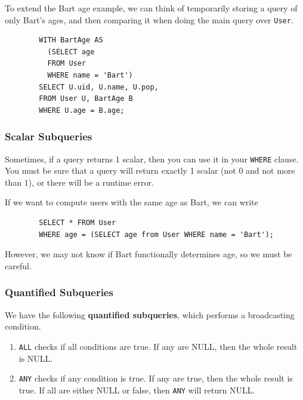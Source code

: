    \begin{example}
      \label{ex:temporary-tables-with-with}
      To extend the Bart age example, we can think of temporarily storing a query of only Bart's ages, and then comparing it when doing the main query over \texttt{User}. 
      \begin{lstlisting}
        WITH BartAge AS 
          (SELECT age 
          FROM User 
          WHERE name = 'Bart') 
        SELECT U.uid, U.name, U.pop, 
        FROM User U, BartAge B 
        WHERE U.age = B.age; 
      \end{lstlisting}
    \end{example}

  \subsubsection{Scalar Subqueries}
    
    \begin{definition}
      \label{def:scalar-subqueries}
      Sometimes, if a query returns 1 scalar, then you can use it in your \texttt{WHERE} clause. You must be sure that a query will return exactly 1 scalar (not $0$ and not more than $1$), or there will be a runtime error.  
    \end{definition}

    \begin{example}
      \label{ex:users-of-the-same-age-as-bart}
      If we want to compute users with the same age as Bart, we can write 
      \begin{lstlisting}
        SELECT * FROM User 
        WHERE age = (SELECT age from User WHERE name = 'Bart'); 
      \end{lstlisting}
      However, we may not know if Bart functionally determines age, so we must be careful. 
    \end{example}

  \subsubsection{Quantified Subqueries}

    \begin{definition}
      \label{def:all-any}
      We have the following \textbf{quantified subqueries}, which performs a broadcasting condition. 
      \begin{enumerate}
        \item \texttt{ALL} checks if all conditions are true. If any are NULL, then the whole result is NULL. 
        \item \texttt{ANY} checks if any condition is true. If any are true, then the whole result is true. If all are either NULL or false, then \texttt{ANY} will return NULL. 
      \end{enumerate}
    \end{definition}


